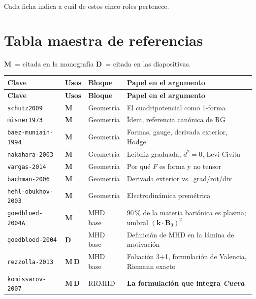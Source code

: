 \documentclass[11pt,openany]{report}
\newcommand{\clave}[1]{\texttt{\small #1}}
\newcommand{\Mono}{\textbf{\color{azulud}M}}
\newcommand{\Dia}{\textbf{\color{verdeok}D}}
\begin{document}
Cada ficha indica a cuál de estos cinco roles pertenece.

\chapter{Tabla maestra de referencias}
\label{ch:tabla}

\Mono~= citada en la monografía \quad \Dia~= citada en las diapositivas.

\begin{small}
\begin{longtable}{@{}p{} p{} p{} p{}@{}}
\toprule
\textbf{Clave} & \textbf{Usos} & \textbf{Bloque} & \textbf{Papel en el argumento} \\
\midrule
\endfirsthead
\toprule
\textbf{Clave} & \textbf{Usos} & \textbf{Bloque} & \textbf{Papel en el argumento} \\
\midrule
\endhead
\clave{schutz2009}          & \Mono            & Geometría   & El cuadripotencial como 1-forma \\
\clave{misner1973}          & \Mono            & Geometría   & Ídem, referencia canónica de RG \\
\clave{baez-muniain-1994}   & \Mono            & Geometría   & Formas, gauge, derivada exterior, Hodge \\
\clave{nakahara-2003}       & \Mono            & Geometría   & Leibniz graduada, $d^2=0$, Levi-Civita \\
\clave{vargas-2014}         & \Mono            & Geometría   & Por qué $F$ es forma y no tensor \\
\clave{bachman-2006}        & \Mono            & Geometría   & Derivada exterior vs.\ grad/rot/div \\
\clave{hehl-obukhov-2003}   & \Mono            & Geometría   & Electrodinámica premétrica \\
\midrule
\clave{goedbloed-2004A}     & \Mono            & MHD base    & 90\,\% de la materia bariónica es plasma; umbral $(\mathbf k\!\cdot\!\mathbf B_0)^2$ \\
\clave{goedbloed-2004}      & \Dia             & MHD base    & Definición de MHD en la lámina de motivación \\
\clave{rezzolla-2013}       & \Mono\,\Dia      & MHD base    & Foliación 3+1, formulación de Valencia, Riemann exacto \\
\clave{komissarov-2007}     & \Mono\,\Dia      & RRMHD       & \textbf{La formulación que integra \textit{Cueva}} \\

\end{longtable}
\end{small}
\end{document}
